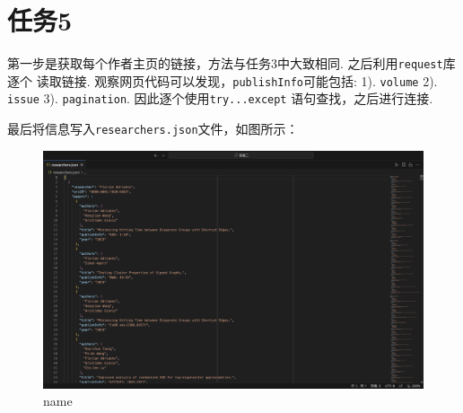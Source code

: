 \documentclass[UTF8]{ctexart}
\begin{document}
\section*{任务5}
第一步是获取每个作者主页的链接，方法与任务3中大致相同. 之后利用\lstinline{request}库逐个
读取链接. 观察网页代码可以发现，\lstinline{publishInfo}可能包括: 1). \lstinline|volume|
2). \lstinline|issue| 3). \lstinline|pagination|. 因此逐个使用\lstinline|try...except|
语句查找，之后进行连接.

最后将信息写入\lstinline|researchers.json|文件，如图所示：
\begin{figure}[h]
  \centering
  \includegraphics[scale=0.2]{researchers.png}
  \caption{name}
\end{figure}


\end{document}
